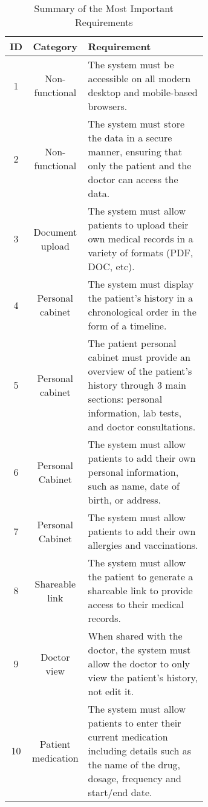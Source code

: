\begin{table}[h!]
    \centering
    \begin{tabular}{|c|c|p{0.65\linewidth}|}
    \hline
    \textbf{ID} & \textbf{Category}                  & \textbf{Requirement}                                                                \\ \hline
    1   & Non-functional     & The system must be accessible on all modern desktop and mobile-based browsers.       \\ \hline
    2   & Non-functional     & The system must store the data in a secure manner, ensuring that only the patient and the doctor can access the data. \\ \hline
    3   & Document upload                 & The system must allow patients to upload their own medical records in a variety of formats (PDF, DOC, etc). \\ \hline
    4  & Personal cabinet        & The system must display the patient's history in a chronological order in the form of a timeline. \\ \hline
    5   & Personal cabinet        & The patient personal cabinet must provide an overview of the patient's history through 3 main sections: personal information, lab tests, and doctor consultations. \\ \hline
    6  & Personal Cabinet & The system must allow patients to add their own personal information, such as name, date of birth, or address. \\ \hline
    7  & Personal Cabinet & The system must allow patients to add their own allergies and vaccinations. \\ \hline
    8   & Shareable link          & The system must allow the patient to generate a shareable link to provide access to their medical records. \\ \hline
    9   & Doctor view & When shared with the doctor, the system must allow the doctor to only view the patient's history, not edit it. \\ \hline
    10   & Patient medication              & The system must allow patients to enter their current medication including details such as the name of the drug, dosage, frequency and start/end date. \\ \hline
    \end{tabular}
    \caption{Summary of the Most Important Requirements}
\end{table}
    
    
    
    